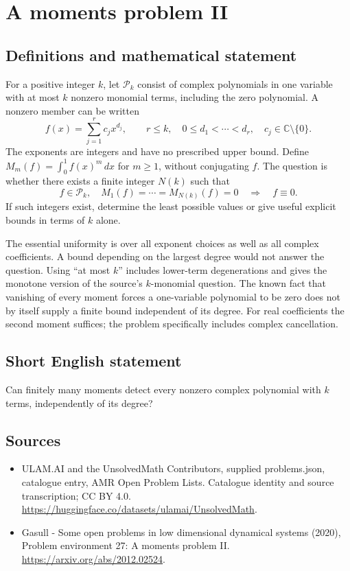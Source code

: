 \documentclass[11pt,a4paper]{article}
\begin{document}
\section*{A moments problem II}\label{statement}

\subsection{Definitions and mathematical statement}
For a positive integer $k$, let $\mathcal P_k$ consist of complex
polynomials in one variable with at most $k$ nonzero monomial terms,
including the zero polynomial. A nonzero member can be written
\[
 f(x)=\sum_{j=1}^r c_jx^{d_j},\qquad
 r\le k,\quad 0\le d_1<\cdots<d_r,\quad c_j\in\mathbb C\setminus\{0\}.
\]
The exponents are integers and have no prescribed upper bound. Define
$M_m(f)=\int_0^1 f(x)^m\,dx$ for $m\ge1$, without conjugating $f$.
The question is whether there exists a finite integer $N(k)$ such that
\[
 f\in\mathcal P_k,\quad
 M_1(f)=\cdots=M_{N(k)}(f)=0
 \quad\Longrightarrow\quad f\equiv0.
\]
If such integers exist, determine the least possible values or give useful
explicit bounds in terms of $k$ alone.

The essential uniformity is over all exponent choices as well as all
complex coefficients. A bound depending on the largest degree would not
answer the question. Using ``at most $k$'' includes lower-term degenerations
and gives the monotone version of the source's $k$-monomial question.
The known fact that vanishing of every moment forces a one-variable
polynomial to be zero does not by itself supply a finite bound independent
of its degree. For real coefficients the second moment suffices; the
problem specifically includes complex cancellation.
\subsection{Short English statement}
Can finitely many moments detect every nonzero complex polynomial with $k$ terms, independently of its degree?
\subsection{Sources}
\begin{itemize}
\item[S1] ULAM.AI and the UnsolvedMath Contributors, supplied problems.json, catalogue entry, AMR Open Problem Lists. Catalogue identity and source transcription; CC BY 4.0.
\url{https://huggingface.co/datasets/ulamai/UnsolvedMath}.
\item[S2] Gasull - Some open problems in low dimensional dynamical systems (2020), Problem environment 27: A moments problem II. 
\url{https://arxiv.org/abs/2012.02524}.
\end{itemize}
\end{document}
